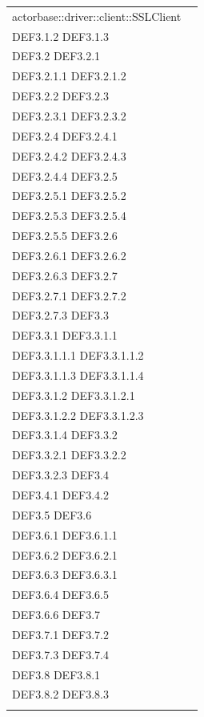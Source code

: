 \documentclass{scalatekids-article}
\begin{document}
\begin{longtable}[H]{|p{12cm}|p{5.5cm}|}
  actorbase::driver::client::SSLClient & \multiLineCell[t]{DEF3.1 DEF3.1.1\\DEF3.1.2 DEF3.1.3\\DEF3.2 DEF3.2.1\\DEF3.2.1.1 DEF3.2.1.2\\DEF3.2.2 DEF3.2.3\\DEF3.2.3.1 DEF3.2.3.2\\DEF3.2.4 DEF3.2.4.1\\DEF3.2.4.2 DEF3.2.4.3\\DEF3.2.4.4 DEF3.2.5\\DEF3.2.5.1 DEF3.2.5.2\\DEF3.2.5.3 DEF3.2.5.4\\DEF3.2.5.5 DEF3.2.6\\DEF3.2.6.1 DEF3.2.6.2\\DEF3.2.6.3 DEF3.2.7\\DEF3.2.7.1 DEF3.2.7.2\\DEF3.2.7.3 DEF3.3\\DEF3.3.1 DEF3.3.1.1\\DEF3.3.1.1.1 DEF3.3.1.1.2\\DEF3.3.1.1.3 DEF3.3.1.1.4\\DEF3.3.1.2 DEF3.3.1.2.1\\DEF3.3.1.2.2 DEF3.3.1.2.3\\DEF3.3.1.4 DEF3.3.2\\DEF3.3.2.1 DEF3.3.2.2\\DEF3.3.2.3 DEF3.4\\DEF3.4.1 DEF3.4.2\\DEF3.5 DEF3.6\\DEF3.6.1 DEF3.6.1.1\\DEF3.6.2 DEF3.6.2.1\\DEF3.6.3 DEF3.6.3.1\\DEF3.6.4 DEF3.6.5\\DEF3.6.6 DEF3.7\\DEF3.7.1 DEF3.7.2\\DEF3.7.3 DEF3.7.4\\DEF3.8 DEF3.8.1\\DEF3.8.2 DEF3.8.3\\}\\
  \hline

\end{longtable}
\end{document}
